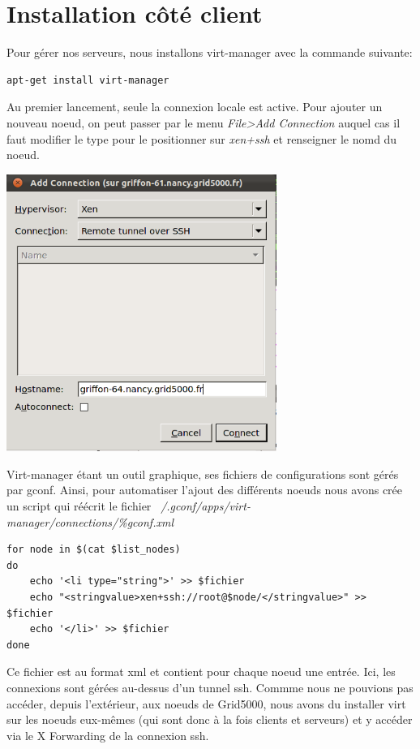 \section{Installation côté client}
Pour gérer nos serveurs, nous installons virt-manager avec la commande suivante:
\begin{lstlisting} 
apt-get install virt-manager
\end{lstlisting}
Au premier lancement, seule la connexion locale est active. Pour ajouter un nouveau noeud, on peut passer par le menu \emph{File>Add Connection} auquel cas il faut modifier le type pour le positionner sur \emph{xen+ssh} et renseigner le nomd du noeud.
\begin{center}
\includegraphics[width=250pt]{images/nouvelle_conn.png}
\end{center}
Virt-manager étant un outil graphique, ses fichiers de configurations sont gérés par gconf. Ainsi, pour automatiser l'ajout des différents noeuds nous avons crée un script qui réécrit le fichier \emph{~/.gconf/apps/virt-manager/connections/\%gconf.xml}
\begin{lstlisting}
for node in $(cat $list_nodes)
do
    echo '<li type="string">' >> $fichier
    echo "<stringvalue>xen+ssh://root@$node/</stringvalue>" >> $fichier
    echo '</li>' >> $fichier
done
\end{lstlisting}
Ce fichier est au format xml et contient pour chaque noeud une entrée. Ici, les connexions sont gérées au-dessus d'un tunnel ssh. Commme nous ne pouvions pas accéder, depuis l'extérieur, aux noeuds de Grid5000, nous avons du installer virt sur les noeuds eux-mêmes (qui sont donc à la fois clients et serveurs) et y accéder via le X Forwarding de la connexion ssh.
